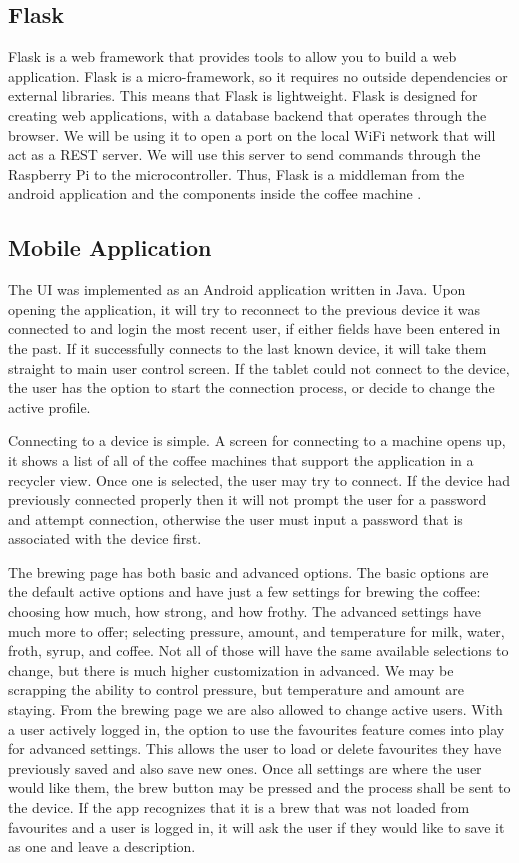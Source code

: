 \documentclass[conference]{IEEEtran}
\begin{document}
\subsection{Flask}
Flask is a web framework that provides tools to allow you to build a web application.
Flask is a micro-framework, so it requires no outside dependencies or external libraries.
This means that Flask is lightweight. Flask is designed for creating web applications,
with a database backend that operates through the browser. We will be using it to open
a port on the local WiFi network that will act as a REST server. We will use
this server to send commands through the Raspberry Pi to the microcontroller. Thus, Flask is a middleman from the 
android application and the components inside the coffee machine \cite{flask}.

\subsection{Mobile Application}
The UI was implemented as an Android application written in Java.
Upon opening the application, it will try to reconnect to the
previous device it was connected to and login the most recent user, if either
fields have been entered in the past. If it successfully connects to the last
known device, it will take them straight to main user control screen. If the tablet could
not connect to the device, the user has the option to start the
connection process, or decide to change the active profile.

Connecting to a device is simple. A screen for connecting
to a machine opens up, it shows a list of all of the coffee
machines that support the application in a recycler view. Once
one is selected, the user may try to connect. If the device
had previously connected properly then it will not prompt the
user for a password and attempt connection, otherwise the
user must input a password that is associated with the device
first.

The brewing page has both basic and advanced options.
The basic options are the default active options and have just
a few settings for brewing the coffee: choosing how much,
how strong, and how frothy. The advanced settings have much
more to offer; selecting pressure, amount, and temperature for
milk, water, froth, syrup, and coffee. Not all of those will have the same
available selections to change, but there is much higher customization in
advanced. We may be scrapping the ability to control pressure, but temperature
and amount are staying. From the brewing page we are also allowed to change
active users. With a user actively logged in, the option to use
the favourites feature comes into play for advanced settings.
This allows the user to load or delete favourites they have
previously saved and also save new ones. Once all settings
are where the user would like them, the brew button may be
pressed and the process shall be sent to the device. If the app
recognizes that it is a brew that was not loaded from favourites
and a user is logged in, it will ask the user if they would like
to save it as one and leave a description.
\end{document}
